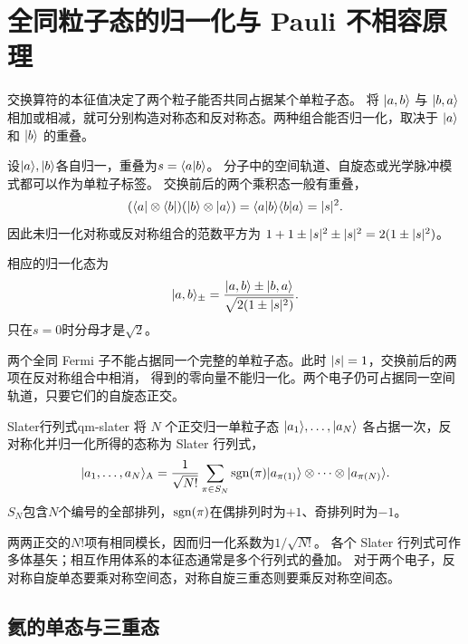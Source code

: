 \section{全同粒子态的归一化与 Pauli 不相容原理}
交换算符的本征值决定了两个粒子能否共同占据某个单粒子态。
将 $\lvert a,b\rangle$ 与 $\lvert b,a\rangle$ 相加或相减，就可分别构造对称态和反对称态。两种组合能否归一化，取决于 $\lvert a\rangle$ 和 $\lvert b\rangle$ 的重叠。

设$\lvert a\rangle,\lvert b\rangle$各自归一，重叠为$s = \langle a\vert b\rangle$。
分子中的空间轨道、自旋态或光学脉冲模式都可以作为单粒子标签。
交换前后的两个乘积态一般有重叠，
\begin{equation}
    (\langle a\rvert \otimes \langle b\rvert)(\lvert b\rangle \otimes \lvert a\rangle)
    = \langle a\vert b\rangle\langle b\vert a\rangle = \lvert s\rvert^2.
\end{equation}
因此未归一化对称或反对称组合的范数平方为
$1 + 1 \pm \lvert s\rvert^2 \pm \lvert s\rvert^2 = 2(1 \pm \lvert s\rvert^2)$。

相应的归一化态为
\begin{equation}
    \lvert a,b\rangle_\pm =
    \frac{\lvert a,b\rangle \pm \lvert b,a\rangle}{\sqrt{2(1 \pm \lvert s\rvert^2)}}.
\end{equation}
只在$s = 0$时分母才是$\sqrt2$。
\begin{corollary}
    两个全同 Fermi 子不能占据同一个完整的单粒子态。此时 $\lvert s\rvert = 1$，交换前后的两项在反对称组合中相消，
    得到的零向量不能归一化。两个电子仍可占据同一空间轨道，只要它们的自旋态正交。
\end{corollary}

\begin{definition}{Slater行列式}{qm-slater}
    将 $N$ 个正交归一单粒子态 $\lvert a_1\rangle,\ldots,\lvert a_N\rangle$ 各占据一次，反对称化并归一化所得的态称为 Slater 行列式，
    \begin{equation}
        \lvert a_1,\ldots,a_N\rangle_{\mathrm{A}} = \frac1{\sqrt{N!}}
        \sum_{\pi\in S_N}\operatorname{sgn}(\pi)\lvert a_{\pi(1)}\rangle \otimes \cdots \otimes \lvert a_{\pi(N)}\rangle.
    \end{equation}
    $S_N$包含$N$个编号的全部排列，$\operatorname{sgn}(\pi)$在偶排列时为$+1$、奇排列时为$-1$。
\end{definition}
两两正交的$N!$项有相同模长，因而归一化系数为$1/\sqrt{N!}$。
各个 Slater 行列式可作多体基矢；相互作用体系的本征态通常是多个行列式的叠加。
对于两个电子，反对称自旋单态要乘对称空间态，对称自旋三重态则要乘反对称空间态。

\subsection{氦的单态与三重态}
\label{ss:qm-helium-exchange}

